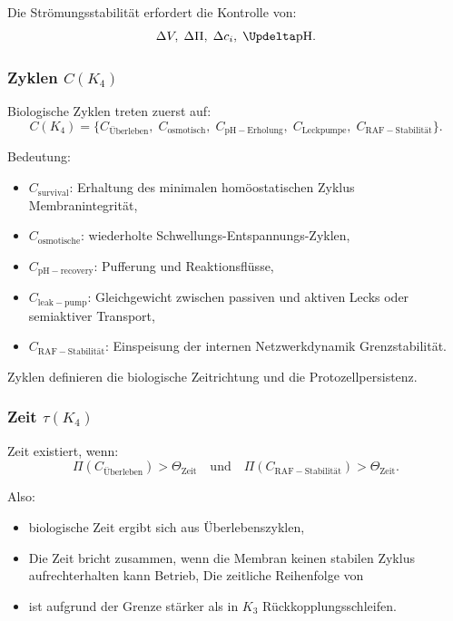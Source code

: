 Die Strömungsstabilität erfordert die Kontrolle von:
\[
\Delta V,\; \Delta \Pi,\; \Delta c_i,\; \Updelta \mathrm{pH}.
\]

\subsubsection{Zyklen \texorpdfstring{$C(K_4)$}{C(K_4)}}

Biologische Zyklen treten zuerst auf:
\[
C(K_4) =
\{ C_{\mathrm{Überleben}},\;
   C_{\mathrm{osmotisch}},\;
   C_{\mathrm{pH-Erholung}},\;
   C_{\mathrm{Leckpumpe}},\;
   C_{\mathrm{RAF-Stabilität}} \}.
\]

Bedeutung:
\begin{itemize}
    \item $C_{\mathrm{survival}}$: Erhaltung des minimalen homöostatischen Zyklus
          Membranintegrität,
    \item $C_{\mathrm{osmotische}}$: wiederholte Schwellungs-Entspannungs-Zyklen,
    \item $C_{\mathrm{pH-recovery}}$: Pufferung und Reaktionsflüsse,
    \item $C_{\mathrm{leak-pump}}$: Gleichgewicht zwischen passiven und aktiven Lecks
          oder semiaktiver Transport,
    \item $C_{\mathrm{RAF-Stabilität}}$: Einspeisung der internen Netzwerkdynamik
          Grenzstabilität.
\end{itemize}

Zyklen definieren die biologische Zeitrichtung und die Protozellpersistenz.

\subsubsection{Zeit \texorpdfstring{$\tau(K_4)$}{\tau(K_4)}}

Zeit existiert, wenn:
\[
\Pi(C_{\mathrm{Überleben}}) > \Theta_{\mathrm{Zeit}}
\quad\text{und}\quad
\Pi(C_{\mathrm{RAF-Stabilität}}) > \Theta_{\mathrm{Zeit}}.
\]

Also:
\begin{itemize}
    \item biologische Zeit ergibt sich aus Überlebenszyklen,
    \item Die Zeit bricht zusammen, wenn die Membran keinen stabilen Zyklus aufrechterhalten kann
          Betrieb,
    Die zeitliche Reihenfolge von \item ist aufgrund der Grenze stärker als in $K_3$
          Rückkopplungsschleifen.
\end{itemize}

